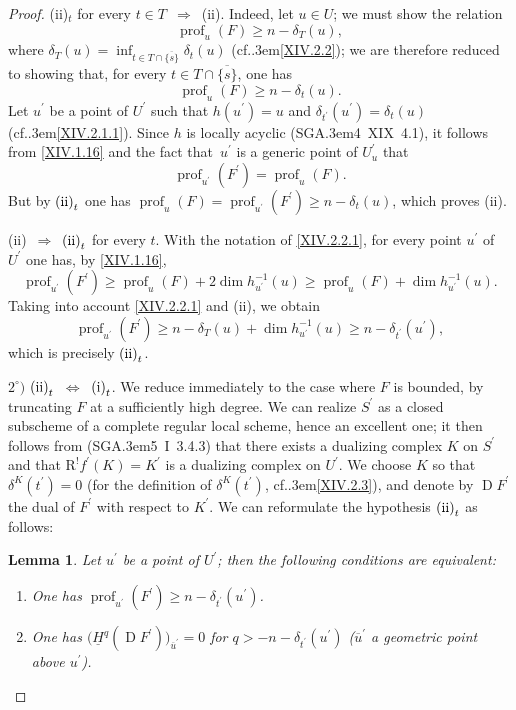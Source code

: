 \documentclass[11pt,a4paper,oneside]{book}
\providecommand{\pageoriginale}{%
  \refstepcounter{pageoriginal}%
  \marginpar{\raggedright\footnotesize\bfseries\thepageoriginal}%
  \xspace}
\providecommand{\cf}{cf.\kern.3em}
\providecommand{\SGA}{\textup{SGA}\kern.3em}
\DeclareMathOperator{\D}{D}
\providecommand{\prof}{\operatorname{prof}}
\providecommand{\R}{\mathrm R}
\providecommand{\SSI}{\unskip~$\Longleftrightarrow$~\ignorespaces}
\providecommand{\ALORS}{\unskip~$\Longrightarrow$~\ignorespaces}
\let\pageoriginaled\pageoriginale
\newenvironment{enumeratei}
  {\begin{enumerate}[label=(\roman*)]}
  {\end{enumerate}}
\theoremstyle{plain}
\newtheorem{sublemme}[subsubsection]{Lemma}
\theoremstyle{definition}
\theoremstyle{remark}
\renewcommand{\Ref}[1]{\textup{\ref{#1}}}
\begin{document}
\begin{proof}
\textup{(ii)}$_{t}$ for every $t\in T$\ALORS\textup{(ii)}. Indeed, let $u\in U$; we must show the relation
$$
\prof_{u}(F)\geq n-\delta_{T}(u),
$$
where $\delta_{T}(u)=\inf_{t\in T\cap\overline{\{ s\} }}\delta_{t}(u)$ (\cf \Ref{XIV.2.2}); we are therefore reduced to showing that, for every $t\in T\cap\overline{\{ s\} }$, one has
$$
\prof_{u}(F)\geq n-\delta_{t}(u).
$$
Let $u^{\prime}$ be a point of $U^{\prime}$ such that $h(u^{\prime})=u$ and $\delta_{t^{\prime}}(u^{\prime})=\delta_{t}(u)$ (\cf \Ref{XIV.2.1.1}). Since $h$ is locally acyclic (\SGA 4~XIX~4.1), it follows from \Ref{XIV.1.16} and the fact that~$u^{\prime}$ is a generic point of $U_{u}^{\prime}$ that
$$
\prof_{u^{\prime}}(F^{\prime})=\prof_{u}(F).
$$
But by $\textup{(ii)}_{t}$ one has $\prof_{u}(F)=\prof_{u^{\prime}}(F^{\prime})\geq n-\delta_{t}(u)$, which proves \textup{(ii)}.

\textup{(ii)}\ALORS$\textup{(ii)}_{t}$ for every $t$. With the notation of \Ref{XIV.2.2.1}, for every point $u^{\prime}$ of $U^{\prime}$ one has, by \Ref{XIV.1.16},
$$
\prof_{u^{\prime}}(F^{\prime})\geq\prof_{u}(F)+2\dim h_{u^{\prime}}^{-1}(u)\geq\prof_{u}(F)+\dim h_{u^{\prime}}^{-1}(u).
$$
Taking into account \Ref{XIV.2.2.1} and \textup{(ii)}, we obtain
$$
\prof_{u^{\prime}}(F^{\prime})\geq n-\delta_{T}(u)+\dim h_{u^{\prime}}^{-1}(u)\geq n-\delta_{t^{\prime}}(u^{\prime}),
$$
which\pageoriginaled is precisely $\textup{(ii)}_{t}$.

$2^\circ)$ $\textup{(ii)}_{t}$\SSI$\textup{(i)}_{t}$. We reduce immediately to the case where $F$ is bounded, by truncating $F$ at a sufficiently high degree. We can realize $S^{\prime}$ as a closed subscheme of a complete regular local scheme, hence an excellent one; it then follows from (\SGA 5~I~3.4.3) that there exists a dualizing complex $K$ on $S^{\prime}$ and that $\R^{!}f^{\prime}(K)=K^{\prime}$ is a dualizing complex on $U^{\prime}$. We choose $K$ so that $\delta^{K}(t^{\prime})=0$ (for the definition of $\delta^{K}(t^{\prime})$, \cf \Ref{XIV.2.3}), and denote by $\D F^{\prime}$ the dual of $F^{\prime}$ with respect to $K^{\prime}$. We can reformulate the hypothesis $\textup{(ii)}_{t}$ as follows:

\begin{sublemme} \label{XIV.4.2.2}
Let $u^{\prime}$ be a point of $U^{\prime}$; then the following conditions are equivalent:
\begin{enumeratei}
\item
One has $\prof_{u^{\prime}}(F^{\prime})\geq n-\delta_{t^{\prime}}(u^{\prime})$.
\item
One has $\big(\underline{H}^{q}(\D F^{\prime}) \big)_{\overline{u}^{\prime}}=0$ for $q>-n-\delta_{t^{\prime}}(u^{\prime})$ ($\overline{u}^{\prime}$ a geometric point above $u^{\prime}$).
\end{enumeratei}
\end{sublemme}


\end{proof}
\end{document}
